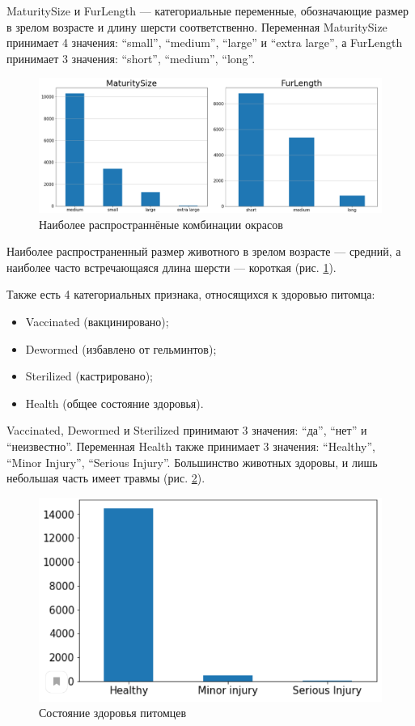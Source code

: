 \documentclass[14pt]{mmcs_article}
\begin{document}
MaturitySize и FurLength --- категориальные переменные, обозначающие размер в зрелом возрасте и длину шерсти соответственно. Переменная MaturitySize принимает 4 значения: ``small'', ``medium'', ``large'' и ``extra large'', а FurLength принимает 3 значения: ``short'', ``medium'', ``long''.

\begin{figure}[H]
	\centering
	\includegraphics[scale=0.45]{sizelength.png}
	\caption{Наиболее распространнёные комбинации окрасов}\label{analyse:sizelength}
\end{figure}

Наиболее распространенный размер животного в зрелом возрасте --- средний, а наиболее часто встречающаяся длина шерсти --- короткая (рис. \ref{analyse:sizelength}).

Также есть 4 категориальных признака, относящихся к здоровью питомца: 

\begin{itemize}
	\item Vaccinated (вакцинировано);
	\item Dewormed (избавлено от гельминтов);
	\item Sterilized (кастрировано);
	\item Health (общее состояние здоровья).
\end{itemize}

Vaccinated, Dewormed и Sterilized принимают 3 значения: ``да'', ``нет'' и ``неизвестно''. Переменная Health также принимает 3 значения: ``Healthy'', ``Minor Injury'', ``Serious Injury''. Большинство животных здоровы, и лишь небольшая часть имеет травмы (рис. \ref{analyse:health}).

\begin{figure}[H]
	\centering
	\includegraphics[scale=0.9]{health.png}
	\caption{Состояние здоровья питомцев}\label{analyse:health}
\end{figure}
\end{document}
